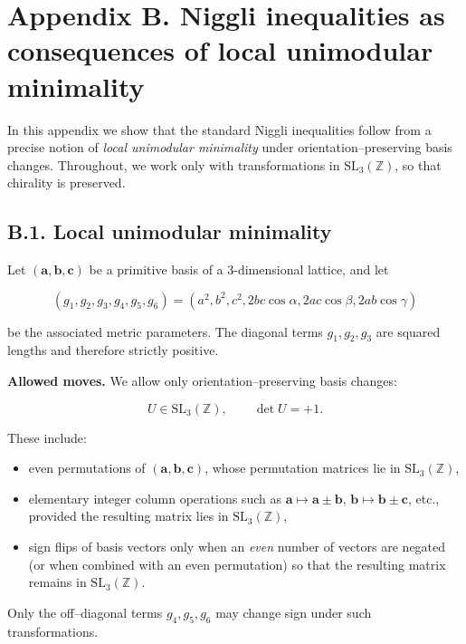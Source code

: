 \documentclass[preprint]{iucr}              %
\numberwithin{equation}{section}
\begin{document}
\appendix

\section*{Appendix B. Niggli inequalities as consequences of local unimodular minimality}
\label{app:niggli-from-local-min}

In this appendix we show that the standard Niggli inequalities follow
from a precise notion of \emph{local unimodular minimality} under
orientation–preserving basis changes.  Throughout, we work only with
transformations in $\mathrm{SL}_3(\mathbb{Z})$, so that chirality is
preserved.

\subsection*{B.1. Local unimodular minimality}

Let $(\mathbf{a},\mathbf{b},\mathbf{c})$ be a primitive basis of a
3-dimensional lattice, and let


\[
(g_1,g_2,g_3,g_4,g_5,g_6)
=
(a^2,b^2,c^2,2bc\cos\alpha,2ac\cos\beta,2ab\cos\gamma)
\]


be the associated metric parameters.  The diagonal terms
$g_1,g_2,g_3$ are squared lengths and therefore strictly positive.

\medskip

\noindent
\textbf{Allowed moves.}
We allow only orientation–preserving basis changes:


\[
U \in \mathrm{SL}_3(\mathbb{Z}), \qquad \det U = +1.
\]


These include:
\begin{itemize}
	\item even permutations of $(\mathbf{a},\mathbf{b},\mathbf{c})$,
	whose permutation matrices lie in $\mathrm{SL}_3(\mathbb{Z})$,
	\item elementary integer column operations such as
	$\mathbf{a} \mapsto \mathbf{a} \pm \mathbf{b}$,
	$\mathbf{b} \mapsto \mathbf{b} \pm \mathbf{c}$,
	etc., provided the resulting matrix lies in $\mathrm{SL}_3(\mathbb{Z})$,
	\item sign flips of basis vectors only when an \emph{even} number of
	vectors are negated (or when combined with an even permutation)
	so that the resulting matrix remains in $\mathrm{SL}_3(\mathbb{Z})$.
\end{itemize}
Only the off–diagonal terms $g_4,g_5,g_6$ may change sign under such
transformations.

\medskip
\end{document}
